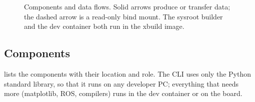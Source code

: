 \documentclass[11pt,a4paper]{article}
\begin{document}
\begin{figure}[t]
\caption{Components and data flows. Solid arrows produce or transfer data; the dashed arrow is a read-only bind
mount. The sysroot builder and the dev container both run in the xbuild image.}\label{fig:arch}
\end{figure}

\subsection{Components}
 lists the components with their location and role. The CLI uses only the Python standard
library, so that it runs on any developer PC; everything that needs more (matplotlib, ROS, compilers) runs in the
dev container or on the board.
\end{document}
